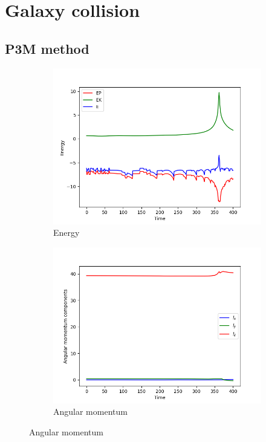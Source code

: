 \section{Galaxy collision}
\subsection{P3M method}
\begin{figure}[htp]
    \centering
    \begin{subfigure}[b]{0.45\textwidth}
        \centering
        \includegraphics[width=\textwidth]{chapters/results/img/p3m-collision/energy.png}
        \caption{Energy}
        \label{fig:physical-quantities-p3m-collision-sub1}
    \end{subfigure}
    \hfill
    \begin{subfigure}[b]{0.45\textwidth}
        \centering
        \includegraphics[width=\textwidth]{chapters/results/img/p3m-collision/angular-momentum.png}
        \caption{Angular momentum}
        \label{fig:physical-quantities-p3m-collision-sub2}
    \end{subfigure}


\end{figure}
